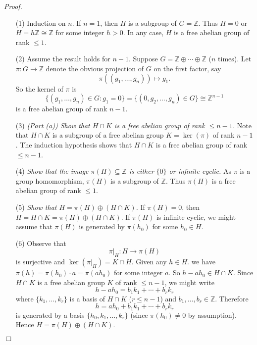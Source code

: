 \documentclass{article}
\begin{document}
\emph{Proof.}
\begin{enumerate}
\item[(1)]
  Induction on $n$.
  If $n = 1$, then $H$ is a subgroup of $G = \mathbb{Z}$.
  Thus $H = 0$ or $H = h\mathbb{Z} \cong \mathbb{Z}$ for some integer $h > 0$.
  In any case, $H$ is a free abelian group of rank $\leq 1$.

\item[(2)]
  Assume the result holds for $n-1$.
  Suppose $G = \mathbb{Z} \oplus \cdots \oplus \mathbb{Z}$ ($n$ times).
  Let $\pi: G \to \mathbb{Z}$ denote the obvious projection of $G$ on the first factor, say
  \[
    \pi((g_1, \ldots, g_n)) \mapsto g_1.
  \]
  So the kernel of $\pi$ is
  \[
    \{ (g_1, \ldots, g_n) \in G : g_1 = 0 \}
    = \{ (0, g_2, \ldots, g_n) \in G \}
    \cong \mathbb{Z}^{n-1}
  \]
  is a free abelian group of rank $n-1$.

\item[(3)]
  \emph{(Part (a)) Show that $H \cap K$ is a free abelian group of rank $\leq n-1$.}
  Note that $H \cap K$ is a subgroup of a free abelian group $K = \ker(\pi)$ of rank $n-1$.
  The induction hypothesis shows that
  $H \cap K$ is a free abelian group of rank $\leq n-1$.

\item[(4)]
  \emph{Show that the image $\pi(H) \subseteq \mathbb{Z}$ is
  either $\{ 0 \}$ or infinite cyclic.}
  As $\pi$ is a group homomorphism, $\pi(H)$ is a subgroup of $\mathbb{Z}$.
  Thus $\pi(H)$ is a free abelian group of rank $\leq 1$.

\item[(5)]
  \emph{Show that $H = \pi(H) \oplus (H \cap K)$.}
  If $\pi(H) = 0$, then $H = H \cap K = \pi(H) \oplus (H \cap K)$.
  If $\pi(H)$ is infinite cyclic,
  we might assume that $\pi(H)$ is generated by $\pi(h_0)$ for some $h_0 \in H$.

\item[(6)]
  Observe that
  \[
    \pi|_{H}: H \to \pi(H)
  \]
  is surjective and $\ker(\pi|_{H}) = K \cap H$.
  Given any $h \in H$.
  we have $\pi(h) = \pi(h_0) \cdot a = \pi(a h_0)$ for some integer $a$.
  So $h - a h_0 \in H \cap K$.
  Since $H \cap K$ is a free abelian group $K$ of rank $\leq n-1$, we might write
  \[
    h - a h_0 = b_1 k_1 + \cdots + b_r k_r
  \]
  where $\{ k_1, \ldots, k_r \}$ is a basis of $H \cap K$ ($r \leq n-1$)
  and $b_1, \ldots, b_r \in \mathbb{Z}$.
  Therefore
  \[
    h = a h_0 + b_1 k_1 + \cdots + b_r k_r
  \]
  is generated by a basis $\{ h_0, k_1, \ldots, k_r \}$
  (since $\pi(h_0) \neq 0$ by assumption).
  Hence $H = \pi(H) \oplus (H \cap K)$.
\end{enumerate}
$\Box$ \\\\
\end{document}
